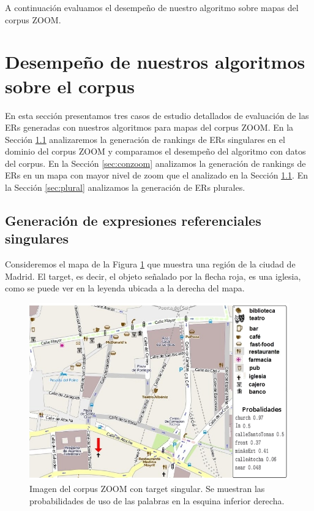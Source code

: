 A continuaci\'on evaluamos el desempe\~no de nuestro algoritmo sobre mapas del corpus ZOOM.

\section{Desempe\~no de nuestros algoritmos sobre el corpus}
\label{sec:caso_estudio}

En esta secci\'on presentamos tres casos de estudio detallados de evaluaci\'on de las ERs generadas con nuestros algoritmos para mapas del corpus ZOOM. En la Secci\'on \ref{sec:sinzoom} analizaremos la generaci\'on de rankings de ERs singulares en el dominio del corpus ZOOM y comparamos el desempe\~no del algoritmo con datos del corpus. En la Secci\'on \ref{sec:conzoom} analizamos la generaci\'on de rankings de ERs en un mapa con mayor nivel de zoom que el analizado en la Secci\'on \ref{sec:sinzoom}. En la Secci\'on \ref{sec:plural} analizamos la generaci\'on de ERs plurales.

\subsection{Generaci\'on de expresiones referenciales singulares}
\label{sec:sinzoom}

Consideremos el mapa de la Figura \ref{mapa-zoom1} que muestra una regi\'on de la ciudad de Madrid. El target, es decir, el objeto se\~nalado por la flecha roja, es una iglesia, como se puede ver en la leyenda ubicada a la derecha del mapa. 

\begin{figure}[h]
\begin{center}
\includegraphics[width=\textwidth]{images/corpus/mapa6-prob.png}
\caption{Imagen del corpus ZOOM con target singular. Se muestran las probabilidades de uso de las palabras en la esquina inferior derecha.}
\label{mapa-zoom1}
\end{center}
\end{figure}

